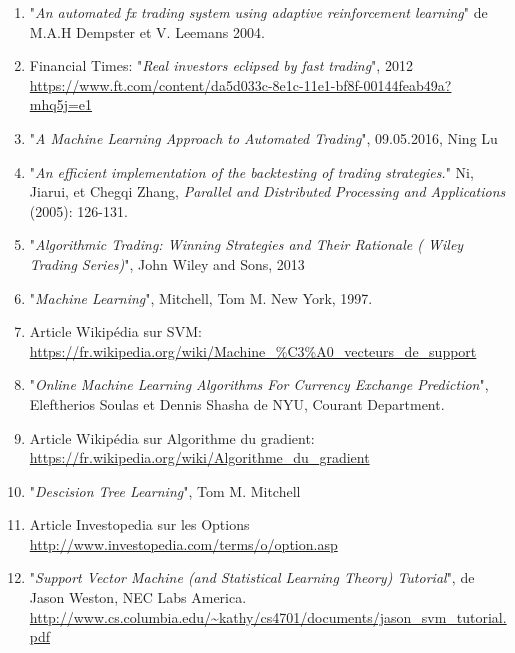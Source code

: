 \documentclass[a4paper, 11pt]{article}
\begin{document}
\begin{enumerate}
\item "\textit{An automated fx trading system using adaptive reinforcement learning}" de M.A.H Dempster et V. Leemans 2004. \label{fx trading}

\item Financial Times: "\textit{Real investors eclipsed by fast trading}", 2012 \url{https://www.ft.com/content/da5d033c-8e1c-11e1-bf8f-00144feab49a?mhq5j=e1} \label{real investors}

\item "\textit{A Machine Learning Approach to Automated Trading}", 09.05.2016, Ning Lu \label{machine learning automated trading}

\item "\textit{An efficient implementation of the backtesting of trading strategies.}" Ni, Jiarui, et Chegqi Zhang, \textit{Parallel and Distributed Processing and Applications} (2005): 126-131.

\item "\textit{Algorithmic Trading: Winning Strategies and Their Rationale ( Wiley Trading Series)}", John Wiley and Sons, 2013

\item "\textit{Machine Learning}", Mitchell, Tom M. New York, 1997. \label{mitchell}

\item Article Wikipédia sur SVM: \url{https://fr.wikipedia.org/wiki/Machine_\%C3\%A0_vecteurs_de_support} \label{wikipedia svm}

\item "\textit{Online Machine Learning Algorithms For Currency Exchange Prediction}", Eleftherios Soulas et Dennis Shasha de NYU, Courant Department. \label{descente du gradient stochastique}

\item  Article Wikipédia sur Algorithme du gradient: \url{https://fr.wikipedia.org/wiki/Algorithme_du_gradient} \label{wikipedia descente du gradient}

\item "\textit{Descision Tree Learning}", Tom M. Mitchell \label{id3}

\item Article Investopedia sur les Options \url{http://www.investopedia.com/terms/o/option.asp}

\item "\textit{Support Vector Machine (and Statistical Learning Theory) Tutorial}", de Jason Weston, NEC Labs America. \url{http://www.cs.columbia.edu/~kathy/cs4701/documents/jason_svm_tutorial.pdf} \label{svm equation}


\end{enumerate}
\end{document}
